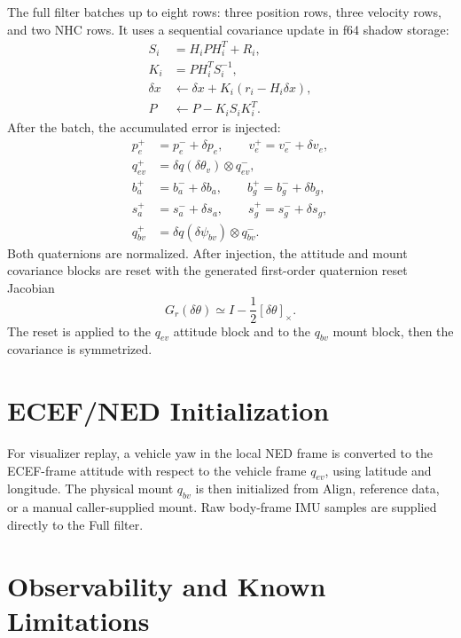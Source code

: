 \documentclass[11pt]{article}
\newcommand{\T}{^{T}}
\newcommand{\crossmat}[1]{\left[#1\right]_\times}
\newcommand{\dq}{\delta q}
\begin{document}
The full filter batches up to eight rows: three position rows, three velocity
rows, and two NHC rows. It uses a sequential covariance update in f64 shadow
storage:
\begin{align}
  S_i &= H_iPH_i\T+R_i,\\
  K_i &= PH_i\T S_i^{-1},\\
  \delta x &\leftarrow \delta x + K_i(r_i-H_i\delta x),\\
  P &\leftarrow P-K_iS_iK_i\T .
\end{align}
After the batch, the accumulated error is injected:
\begin{align}
  p_e^{+}&=p_e^{-}+\delta p_e,\qquad
  v_e^{+}=v_e^{-}+\delta v_e,\\
  q_{ev}^{+}&=\dq(\delta\theta_v)\otimes q_{ev}^{-},\\
  b_a^{+}&=b_a^{-}+\delta b_a,\qquad
  b_g^{+}=b_g^{-}+\delta b_g,\\
  s_a^{+}&=s_a^{-}+\delta s_a,\qquad
  s_g^{+}=s_g^{-}+\delta s_g,\\
  q_{bv}^{+}&=\dq(\delta\psi_{bv})\otimes q_{bv}^{-}.
\end{align}
Both quaternions are normalized. After injection, the attitude and mount
covariance blocks are reset with the generated first-order quaternion
reset Jacobian
\begin{equation}
  G_r(\delta\theta)\simeq I-\frac{1}{2}\crossmat{\delta\theta}.
\end{equation}
The reset is applied to the \(q_{ev}\) attitude block and to the \(q_{bv}\)
mount block, then the covariance is symmetrized.

\section{ECEF/NED Initialization}

For visualizer replay, a vehicle yaw in the local NED frame is converted to the
ECEF-frame attitude with respect to the vehicle frame \(q_{ev}\), using latitude
and longitude. The physical mount \(q_{bv}\) is then initialized from Align,
reference data, or a manual caller-supplied mount. Raw body-frame IMU samples
are supplied directly to the Full filter.

\section{Observability and Known Limitations}
\end{document}
